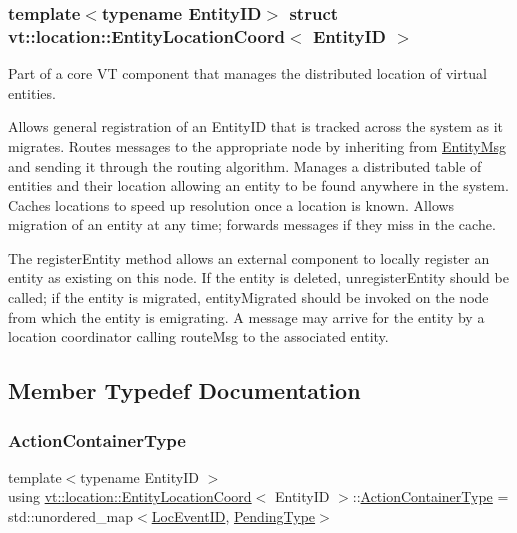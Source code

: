 \subsubsection*{template$<$typename Entity\+ID$>$\newline
struct vt\+::location\+::\+Entity\+Location\+Coord$<$ Entity\+I\+D $>$}

Part of a core VT component that manages the distributed location of virtual entities. 

Allows general registration of an {\ttfamily Entity\+ID} that is tracked across the system as it migrates. Routes messages to the appropriate node by inheriting from {\ttfamily \hyperlink{structvt_1_1location_1_1_entity_msg}{Entity\+Msg}} and sending it through the routing algorithm. Manages a distributed table of entities and their location allowing an entity to be found anywhere in the system. Caches locations to speed up resolution once a location is known. Allows migration of an entity at any time; forwards messages if they miss in the cache.

The {\ttfamily register\+Entity} method allows an external component to locally register an entity as existing on this node. If the entity is deleted, {\ttfamily unregister\+Entity} should be called; if the entity is migrated, {\ttfamily entity\+Migrated} should be invoked on the node from which the entity is emigrating. A message may arrive for the entity by a location coordinator calling {\ttfamily route\+Msg} to the associated entity. 

\subsection{Member Typedef Documentation}
\mbox{\label{structvt_1_1location_1_1_entity_location_coord_afeaaebfc1d7cbdd20cccbd348d96748a}} 
\subsubsection{\texorpdfstring{Action\+Container\+Type}{ActionContainerType}}
{\footnotesize\ttfamily template$<$typename Entity\+ID $>$ \\
using \hyperlink{structvt_1_1location_1_1_entity_location_coord}{vt\+::location\+::\+Entity\+Location\+Coord}$<$ Entity\+ID $>$\+::\hyperlink{structvt_1_1location_1_1_entity_location_coord_afeaaebfc1d7cbdd20cccbd348d96748a}{Action\+Container\+Type} =  std\+::unordered\+\_\+map$<$\hyperlink{namespacevt_1_1location_aa5ccc1a42aa22b0b41fcfbbdee314dca}{Loc\+Event\+ID}, \hyperlink{structvt_1_1location_1_1_entity_location_coord_a41b5c3792967e089c7e592b705c266c3}{Pending\+Type}$>$}

